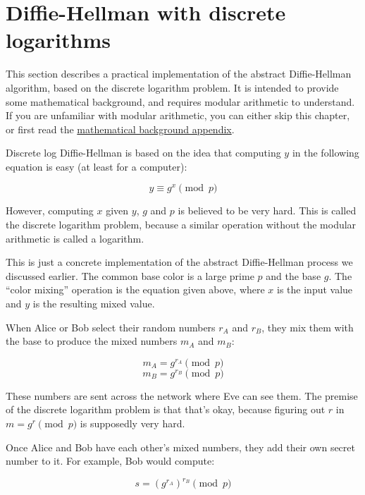 \documentclass[11pt,ebook,table,dvipsnames]{memoir}
\begin{document}
\section{Diffie-Hellman with discrete logarithms}
\label{sec-2-4-3}

This section describes a practical implementation of the abstract
Diffie-Hellman algorithm, based on the discrete logarithm problem. It
is intended to provide some mathematical background, and requires
modular arithmetic to understand. If you are unfamiliar with modular
arithmetic, you can either skip this chapter, or first read the
\hyperref[Modular-arithmetic]{mathematical background appendix}.

Discrete log Diffie-Hellman is based on the idea that computing $y$ in
the following equation is easy (at least for a computer):

\begin{equation}
y \equiv g^x \pmod{p}
\end{equation}

However, computing $x$ given $y$, $g$ and $p$ is believed to be very
hard. This is called the discrete logarithm problem, because a similar
operation without the modular arithmetic is called a logarithm.

This is just a concrete implementation of the abstract Diffie-Hellman
process we discussed earlier. The common base color is a large prime
$p$ and the base $g$. The \enquote{color mixing} operation is the equation
given above, where $x$ is the input value and $y$ is the resulting
mixed value.

When Alice or Bob select their random numbers $r_A$ and $r_B$, they
mix them with the base to produce the mixed numbers $m_A$ and $m_B$:

\begin{equation}
m_A = g^{r_A} \pmod{p}
\end{equation}
\begin{equation}
m_B = g^{r_B} \pmod{p}
\end{equation}

These numbers are sent across the network where Eve can see them. The
premise of the discrete logarithm problem is that that's okay, because
figuring out $r$ in $m = g^r \pmod{p}$ is supposedly very hard.

Once Alice and Bob have each other's mixed numbers, they add their own
secret number to it. For example, Bob would compute:

\begin{equation}
s = (g^{r_A})^{r_B} \pmod{p}
\end{equation}
\end{document}
